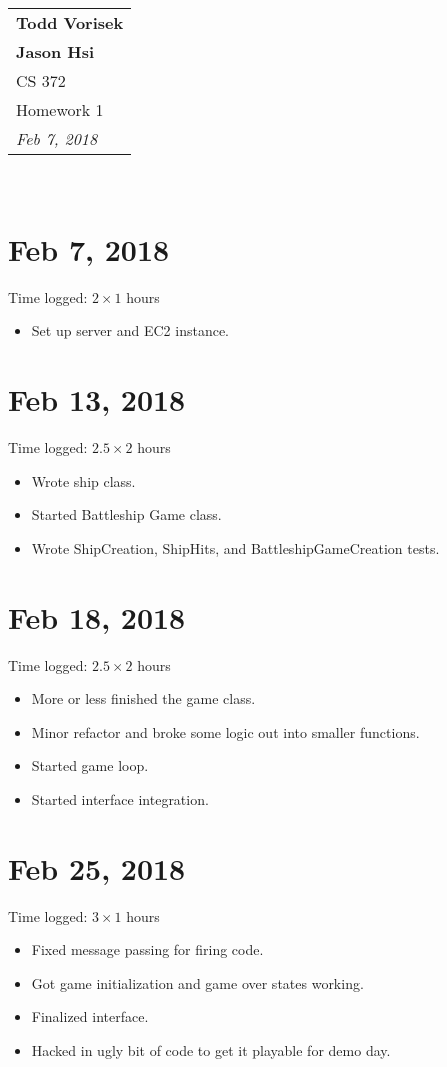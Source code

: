 \documentclass{article}
\begin{document}
  \null\hfill
  \begin{tabular}[t]{l@{}}
    \textbf{Todd Vorisek}\\
    \textbf{Jason Hsi} \\
    CS 372 \\
    Homework 1\\
    \textit{Feb 7, 2018} \\
  \end{tabular}\\

  \section*{Feb 7, 2018}
    Time logged: $2 \times 1 $ hours
    \begin{itemize}
      \item Set up server and EC2 instance.
    \end{itemize}

  \section*{Feb 13, 2018}
    Time logged: $2.5 \times 2 $ hours
    \begin{itemize}
      \item Wrote ship class. 
      \item Started Battleship Game class. 
      \item Wrote ShipCreation, ShipHits, and BattleshipGameCreation tests.
    \end{itemize}

  \section*{Feb 18, 2018}
    Time logged: $2.5 \times 2 $ hours
    \begin{itemize}
      \item More or less finished the game class.
      \item Minor refactor and broke some logic out into smaller functions.
      \item Started game loop.
      \item Started interface integration.
    \end{itemize}

  \section*{Feb 25, 2018}
    Time logged: $3 \times 1 $ hours
    \begin{itemize}
      \item Fixed message passing for firing code.
      \item Got game initialization and game over states working.
      \item Finalized interface.
      \item Hacked in ugly bit of code to get it playable for demo day.
    \end{itemize}
\end{document}
